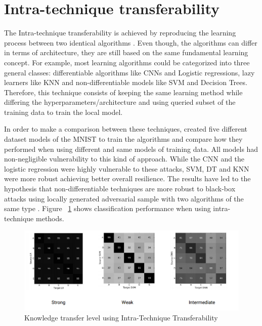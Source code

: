 \medskip



\section{Intra-technique transferability}\label{sec:intra}

The Intra-technique transferability is achieved by reproducing the learning process between two identical algorithms \cite{papernot2016transf}. Even though, the algorithms can differ in terms of architecture, they are still based on the same fundamental learning concept. For example, most learning algorithms could be categorized into three general classes: differentiable algorithms like CNNs and Logistic regressions, lazy learners like KNN and non-differentiable models like SVM and Decision Trees. Therefore, this technique consists of keeping the same learning method while differing the hyperparameters/architecture and using queried subset of the training data to train the local model. 



In order to make a comparison between these techniques, \cite{papernot2016transf} created five different dataset models of the MNIST to train the algorithms and compare how they performed when using different and same models of training data. All models had non-negligible vulnerability to this kind of approach. While the CNN and the logistic regression were highly vulnerable to these attacks, SVM, DT and KNN were more robust achieving better overall resilience. The results have led to the hypothesis that non-differentiable techniques are more robust to black-box attacks using locally generated adversarial sample with two algorithms of the same type \cite{papernot2016}. Figure ~\ref{fig:intra} shows classification performance when using intra-technique methods.

\begin{figure}[!h]
	\centering
	\includegraphics[scale=0.6]{intra.png}
	\caption{Knowledge transfer level using Intra-Technique Transferability \cite{papernot2016transf}}
	\label{fig:intra}
\end{figure}



